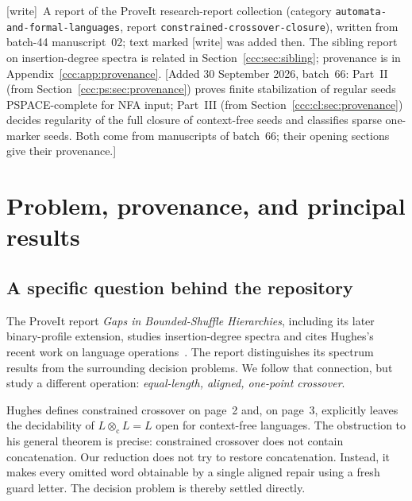 \documentclass[11pt,letterpaper]{article}
\theoremstyle{definition}
\theoremstyle{remark}
\newcommand{\cut}{\otimes_{\mathrm c}}
\newcommand{\wtag}{\textup{[write]}}
\newcommand{\wadd}[1]{\textup{[}Added 30 September 2026, batch~66: #1\textup{]}}
\begin{document}
\begin{titlepage}
\smallskip\noindent\wtag\ A report of the ProveIt research-report collection
(category \texttt{automata-and-formal-languages}, report
\texttt{constrained-crossover-closure}), written
from batch-44 manuscript~02; text marked \wtag{} was added then. The sibling
report on insertion-degree spectra is related in Section~\ref{ccc:sec:sibling};
provenance is in Appendix~\ref{ccc:app:provenance}.
\wadd{Part~II (from Section~\ref{ccc:ps:sec:provenance}) proves finite
stabilization of regular seeds PSPACE-complete for NFA input; Part~III (from
Section~\ref{ccc:cl:sec:provenance}) decides regularity of the full closure of
context-free seeds and classifies sparse one-marker seeds. Both come from
manuscripts of batch~66; their opening sections give their provenance.}
\end{titlepage}
\hypersetup{pageanchor=true}

\begingroup\small\setlength{\parskip}{0pt}
\tableofcontents
\endgroup
\clearpage


\section{Problem, provenance, and principal results}\label{ccc:sec:intro}

\subsection{A specific question behind the repository}

The ProveIt report \emph{Gaps in Bounded-Shuffle Hierarchies}, including its
later binary-profile extension, studies insertion-degree spectra and cites
Hughes's recent work on language operations~\cite{Repo,Hughes}.
The report distinguishes its spectrum results from the surrounding decision
problems. We follow that connection, but study a different operation:
\emph{equal-length, aligned, one-point crossover}.

Hughes defines constrained crossover on page~2 and, on page~3, explicitly
leaves the decidability of $L\cut L=L$ open for context-free languages. The
obstruction to his general theorem is precise: constrained crossover does not
contain concatenation. Our reduction does not try to restore concatenation.
Instead, it makes every omitted word obtainable by a single aligned repair
using a fresh guard letter. The decision problem is thereby settled directly.
\end{document}
